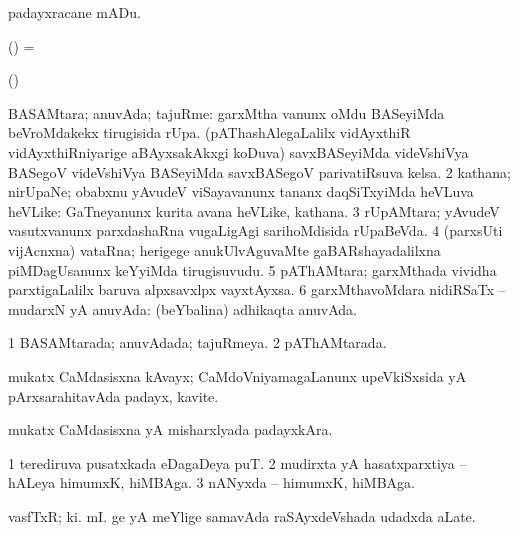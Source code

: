 {{{{\noindent 
\gl{\akirx}
\expl{}
\bmng
 padayxracane mADu. 
\emng
\eentry

\bentry
{} 
\gl{\nA}
\expl{}
\bmng
 (\ga) =  
\emng
\eentry

\bentry
{} 
\gl{\nA}
\expl{}
\bmng
 (\ga) 
\emng
\eentry

\bentry
{} 
\gl{\nA}
\expl{}
\bmng
\bnum
{} BASAMtara; anuvAda; tajuRme: 
\banum
{} garxMtha \mo vanunx oMdu BASeyiMda beVroMdakekx tirugisida rUpa. 
 (pAThashAlegaLalilx vidAyxthiR vidAyxthiRniyarige aBAyxsakAkxgi koDuva) savxBASeyiMda videVshiVya BASegoV videVshiVya BASeyiMda savxBASegoV parivatiRsuva kelsa. 
\eanum
\numie
\num{2} kathana; nirUpaNe; obabxnu yAvudeV viSayavanunx tananx daqSiTxyiMda heVLuva heVLike:  GaTneyanunx kurita avana heVLike, kathana. 
\num{3} rUpAMtara; yAvudeV vasutxvanunx parxdashaRna \mo vugaLigAgi sarihoMdisida rUpaBeVda. 
\num{4} (parxsUti vijAcnxna) vataRna; herigege anukUlvAguvaMte gaBARshayadalilxna piMDagUsanunx keYyiMda tirugisuvudu. 
\num{5} pAThAMtara; garxMthada vividha parxtigaLalilx baruva alpxsavxlpx vayxtAyxsa. 
\num{6} garxMthavoMdara nidiRSaTx -- mudarxN yA anuvAda:  (beYbalina) adhikaqta anuvAda. 
\enum
\emng
\eentry

\bentry
{} 
\gl{\gu}
\expl{}
\bmng
\bnum
\num{1} BASAMtarada; anuvAdada; tajuRmeya. 
\num{2} pAThAMtarada. 
\enum
\emng
\eentry

\bentry
{} 
\gl{\nA}
\expl{\F\ }
\bmng
 mukatx CaMdasisxna kAvayx; CaMdoVniyamagaLanunx upeVkiSxsida yA pArxsarahitavAda padayx, kavite. 
\emng
\eentry

\bentry
{} 
\gl{\nA}
\expl{\F\ }
\bmng
 mukatx CaMdasisxna yA misharxlyada padayxkAra. 
\emng
\eentry

\bentry
{} 
\gl{\nA}
\bmng
\bnum
\num{1} terediruva pusatxkada eDagaDeya puT. 
\num{2} mudirxta yA hasatxparxtiya -- hALeya himumxK, hiMBAga. 
\num{3} nANyxda -- himumxK, hiMBAga. 
\enum
\emng
\eentry

\bentry
{} 
\gl{\nA}
\expl{}
\bmng
 vasfTxR;  ki. mI. ge yA  meYlige samavAda raSAyxdeVshada udadxda aLate. 
\emng
\eentry

}}}}
